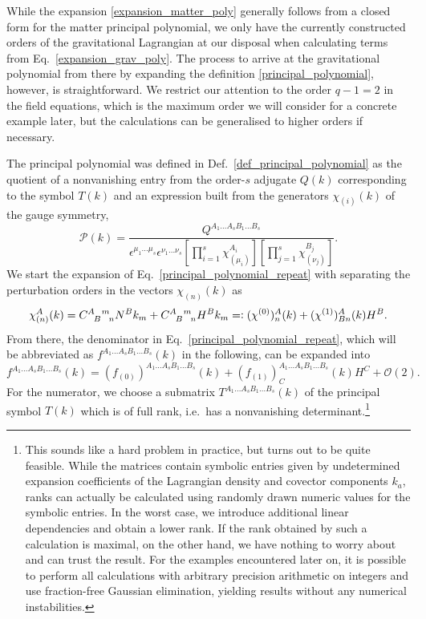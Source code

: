 While the expansion \eqref{expansion_matter_poly} generally follows from a closed form for the matter principal polynomial, we only have the currently constructed orders of the gravitational Lagrangian at our disposal when calculating terms from Eq.~\ref{expansion_grav_poly}. The process to arrive at the gravitational polynomial from there by expanding the definition \eqref{principal_polynomial}, however, is straightforward. We restrict our attention to the order $q-1=2$ in the field equations, which is the maximum order we will consider for a concrete example later, but the calculations can be generalised to higher orders if necessary.

The principal polynomial was defined in Def.~\ref{def_principal_polynomial} as the quotient of a nonvanishing entry from the order-$s$ adjugate $Q(k)$ corresponding to the symbol $T(k)$ and an expression built from the generators $\chi_{(i)}(k)$ of the gauge symmetry,
\begin{equation}\label{principal_polynomial_repeat}
    \mathcal P(k) = \frac{Q^{A_1\dots A_sB_1\dots B_s}}{\epsilon^{\mu_1\dots\mu_s}\epsilon^{\nu_1\dots\nu_s}\left\lbrack\prod_{i=1}^s\chi_{(\mu_i)}^{A_i}\right\rbrack\left\lbrack\prod_{j=1}^s\chi_{(\nu_j)}^{B_j}\right\rbrack}.
\end{equation}
We start the expansion of Eq.~\ref{principal_polynomial_repeat} with separating the perturbation orders in the vectors $\chi_{(n)}(k)$ as 
\begin{equation}
  \chi_{(n)}^A(k) = \gmc{A}{B}{m}{n}N^Bk_m + \gmc{A}{B}{m}{n}H^Bk_m =\vcentcolon (\chi^{(0)})^A_n(k) + (\chi^{(1)})^A_{Bn}(k)H^B.
\end{equation}
From there, the denominator in Eq.~\ref{principal_polynomial_repeat}, which will be abbreviated as $f^{A_1\dots A_sB_1\dots B_s}(k)$ in the following, can be expanded into
\begin{equation}\label{expansion_f}
  f^{A_1\dots A_sB_1\dots B_s}(k) = (f_{(0)})^{A_1\dots A_sB_1\dots B_s}(k) + (f_{(1)})^{A_1\dots A_sB_1\dots B_s}_C(k)H^C + \mathcal O(2).
\end{equation}
For the numerator, we choose a submatrix $T^{A_1\dots A_sB_1\dots B_s}(k)$ of the principal symbol $T(k)$ which is of full rank, i.e.\ has a nonvanishing determinant.\footnote{This sounds like a hard problem in practice, but turns out to be quite feasible. While the matrices contain symbolic entries given by undetermined expansion coefficients of the Lagrangian density and covector components $k_a$, ranks can actually be calculated using randomly drawn numeric values for the symbolic entries. In the worst case, we introduce additional linear dependencies and obtain a lower rank. If the rank obtained by such a calculation is maximal, on the other hand, we have nothing to worry about and can trust the result. For the examples encountered later on, it is possible to perform all calculations with arbitrary precision arithmetic on integers and use fraction-free Gaussian elimination, yielding results without any numerical instabilities.}

